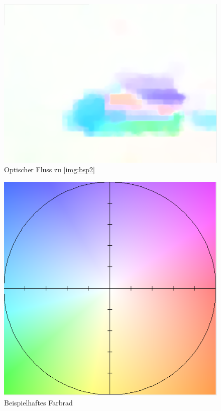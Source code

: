 \begin{figure}[p]
	\centering
	\includegraphics[scale=0.5]{./Abbildungen/5.png}
	\caption{Optischer Fluss zu \ref{img:bsp2}}
	\label{img:bsp3}
\end{figure}

\begin{figure}[p]
	\centering
	\includegraphics[scale=0.5]{./Abbildungen/6.png}
	\caption{Beispielhaftes Farbrad}
	\label{img:bsp4}
\end{figure}

